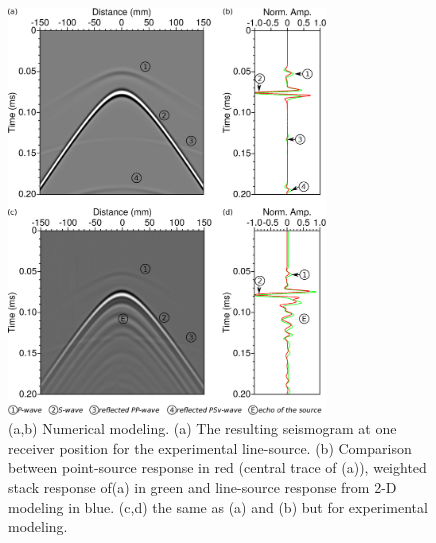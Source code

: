 \documentclass[manuscript,revised]{geophysics}
\newcommand{\twod}{2-D }
\begin{document}
\begin{figure}[!h]
\centering
\includegraphics[width=0.75\textwidth]{fig/amplitude_stack_principle.eps}
\caption{(a,b) Numerical modeling. (a) The resulting seismogram at one receiver position for the experimental line-source. (b) Comparison between point-source response in red (central trace of (a)), weighted stack response of(a) in green and line-source response from \twod modeling in blue. (c,d) the same as (a) and (b) but for experimental modeling.}
\label{amplitude_stack_principle}
\end{figure}
\end{document}
